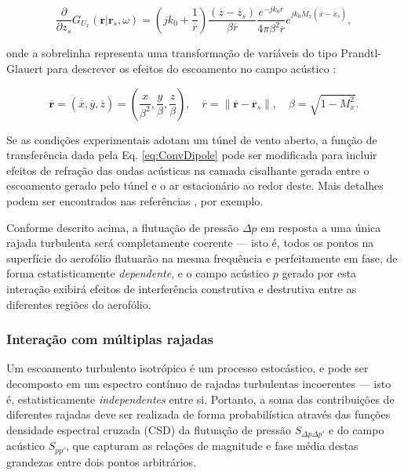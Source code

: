 \documentclass[a4paper, 11pt, twoside]{article}
\providecommand{\norm}[1]{\lVert#1\rVert}
\begin{document}
\begin{equation}
	\frac{\partial}{\partial z_s} G_{U_x} (\mathbf{r} | \mathbf{r}_s, \omega) = \left(jk_0 + \frac{1}{\overline{r}} \right) \frac{\left(\overline{z}-\overline{z}_s \right)}{\beta \overline{r}}  \frac{e^{-j k_0 \overline{r}}}{4 \pi \beta^2 \overline{r}} e^{j k_0 M_x \left( \overline{\overline{x}} - \overline{\overline{x}}_s \right)},
	\label{eq:ConvDipole}
\end{equation}

\noindent onde a sobrelinha representa uma transformação de variáveis do tipo Prandtl-Glauert para descrever os efeitos do escoamento no campo acústico \cite{Chapman00}:

\begin{equation}
	\overline{\mathbf{r}} = \left( \overline{\overline{x}}, \overline{y}, \overline{z} \right) = \left( \frac{x}{\beta^2}, \frac{y}{\beta}, \frac{z}{\beta} \right), \quad \overline{r} = \norm{\overline{\mathbf{r}} - \overline{\mathbf{r}}_s}, \quad \beta = \sqrt{1-M_x^2}.
	\label{eq:ChapmanTransformedVariables}
\end{equation}

Se as condições experimentais adotam um túnel de vento aberto, a função de transferência dada pela Eq. \ref{eq:ConvDipole} pode ser modificada para incluir efeitos de refração das ondas acústicas na camada cisalhante gerada entre o escoamento gerado pelo túnel e o ar estacionário ao redor deste. Mais detalhes podem ser encontrados nas referências \cite{Casagrande18, Casagrande_etal2020}, por exemplo.

Conforme descrito acima, a flutuação de pressão $\Delta p$ em resposta a uma única rajada turbulenta será completamente coerente --- isto é, todos os pontos na superfície do aerofólio flutuarão na mesma frequência e perfeitamente em fase, de forma estatisticamente \emph{dependente}, e o campo acústico $p$ gerado por esta interação exibirá efeitos de interferência construtiva e destrutiva entre as diferentes regiões do aerofólio.

\subsubsection{Interação com múltiplas rajadas}

Um escoamento turbulento isotrópico é um processo estocástico, e pode ser decomposto em um espectro contínuo de rajadas turbulentas incoerentes --- isto é, estatisticamente \emph{independentes} entre si. Portanto, a soma das contribuições de diferentes rajadas deve ser realizada de forma probabilística através das funções densidade espectral cruzada (CSD) da flutuação de pressão $S_{\Delta p \Delta p'}$ e do campo acústico $S_{pp'}$, que capturam as relações de magnitude e fase média destas grandezas entre dois pontos arbitrários.
\end{document}
